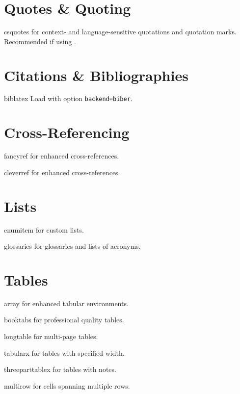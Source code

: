 \documentclass[a4paper,welsh,british,twocolumn]{article}
\begin{document}
\section{Quotes \& Quoting}
\begin{pkgdescription}
  \item[csquotes] for context- and language-sensitive quotations and quotation marks. Recommended if using .
\end{pkgdescription}
\section{Citations \& Bibliographies}
\begin{pkgdescription}
  \item[biblatex] Load with option \verb|backend=biber|.
\end{pkgdescription}
\section{Cross-Referencing}
\begin{pkgdescription}
  \item[fancyref] for enhanced cross-references.
  \item[cleverref] for enhanced cross-references.
\end{pkgdescription}
\section{Lists}
\begin{pkgdescription}
  \item[enumitem] for custom lists.
  \item[glossaries] for glossaries and lists of acronyms.
\end{pkgdescription}
\section{Tables}
\begin{pkgdescription}
  \item[array] for enhanced tabular environments.
  \item[booktabs] for professional quality tables.
  \item[longtable] for multi-page tables.
  \item[tabularx] for tables with specified width.
  \item[threeparttablex] for tables with notes.
  \item[multirow] for cells spanning multiple rows.
\end{pkgdescription}
\end{document}
